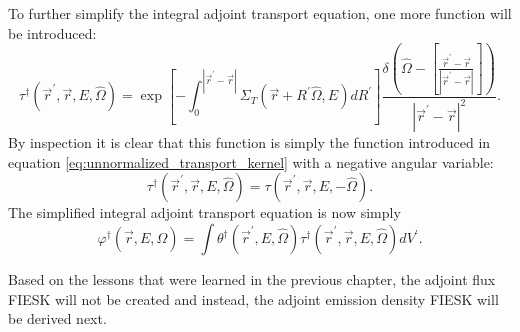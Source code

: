 To further simplify the integral adjoint transport equation, one more function
will be introduced:
\begin{equation}
  \tau^{\dagger}(\vec{r}^{'},\vec{r},E,\hat{\Omega}) = 
  \exp{\left[-\int_0^{|\vec{r}^{'} - \vec{r}|} 
      \Sigma_T(\vec{r}+R^{'}\hat{\Omega},E)dR^{'} \right]}
    \frac{\delta \left(\hat{\Omega} - \left[\frac{\vec{r}^{'} - \vec{r}}
        {|\vec{r}^{'} - \vec{r}|}\right]\right)}
    {|\vec{r}^{'} - \vec{r}|^2}.
\end{equation}
By inspection it is clear that this function is simply the function 
introduced in equation \ref{eq:unnormalized_transport_kernel} with a negative
angular variable:
\begin{equation}
  \tau^{\dagger}(\vec{r}^{'},\vec{r},E,\hat{\Omega}) = 
  \tau(\vec{r}^{'},\vec{r},E,-\hat{\Omega}).
\end{equation}
The simplified integral adjoint transport equation is now simply
\begin{equation}
  \varphi^{\dagger}(\vec{r},E,\hat{\Omega}) = 
    \int \theta^{\dagger}(\vec{r}^{'},E,\hat{\Omega}) 
    \tau^{\dagger}(\vec{r}^{'},\vec{r},E,\hat{\Omega}) dV^{'}.
  \label{eq:volume_integral_adj_transport_eqn}
\end{equation}

Based on the lessons that were learned in the previous chapter, the adjoint
flux FIESK will not be created and instead, the adjoint emission density FIESK 
will be derived next.

